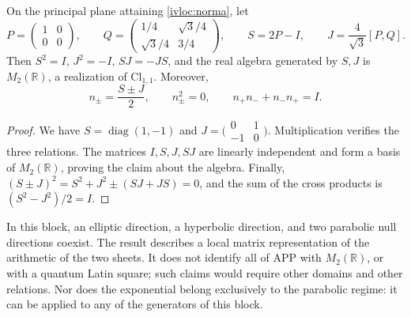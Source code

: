\begin{proposition}
\label{ivloc:algebra}
On the principal plane attaining \eqref{ivloc:norma}, let
\[
 P=\begin{pmatrix}1&0\\0&0\end{pmatrix},\qquad
 Q=\begin{pmatrix}1/4&\sqrt3/4\\\sqrt3/4&3/4\end{pmatrix},\qquad
 S=2P-I,\qquad J=\frac4{\sqrt3}[P,Q].
\]
Then \(S^2=I\), \(J^2=-I\), \(SJ=-JS\), and the real algebra
generated by \(S,J\) is \(M_2(\mathbb R)\), a realization of
\(\mathrm{Cl}_{1,1}\). Moreover,
\[
 n_\pm=\frac{S\pm J}{2},\qquad
 n_\pm^2=0,\qquad n_+n_-+n_-n_+=I.
\]
\end{proposition}
\begin{proof}
We have \(S=\operatorname{diag}(1,-1)\) and
\(J=\bigl(\begin{smallmatrix}0&1\\-1&0\end{smallmatrix}\bigr)\).
Multiplication verifies the three relations. The matrices
\(I,S,J,SJ\) are linearly independent and form a basis of
\(M_2(\mathbb R)\), proving the claim about the algebra.
Finally, \((S\pm J)^2=S^2+J^2\pm(SJ+JS)=0\), and the sum of the
cross products is \((S^2-J^2)/2=I\).
\end{proof}

In this block, an elliptic direction, a hyperbolic direction, and two
parabolic null directions coexist. The result describes a local
matrix representation of the arithmetic of the two sheets. It does not identify all of APP
with \(M_2(\mathbb R)\), or with a quantum Latin square; such
claims would require other domains and other relations. Nor does the
exponential belong exclusively to the parabolic regime: it can
be applied to any of the generators of this block.
